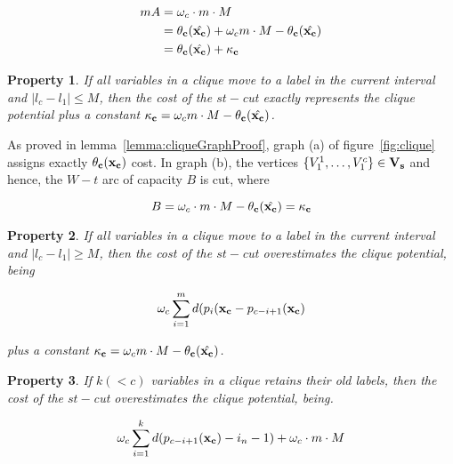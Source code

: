 \documentclass[10pt,letterpaper]{article}
\newtheorem{property}{Property}
\begin{document}
\begin{align*}
mA &= \omega_c \cdot m \cdot M \\
&= \theta_{\bf c}(\hat{{\bf x}_{\bf c}}) + \omega_c m \cdot M - \theta_{\bf c}(\hat{{\bf x}_{\bf c}})\\
&= \theta_{\bf c}(\hat{{\bf x}_{\bf c}}) + {\bf \kappa}_{\bf c}
\end{align*}

\begin{property} If all variables in a clique move to a label in the current interval and $|l_c - l_1| \leq M$, then the cost of the $st-$cut exactly represents the clique potential plus a constant ${\bf \kappa}_{\bf c} = \omega_c m \cdot M - \theta_{\bf c}(\hat{{\bf x}_{\bf c}})$.
\end{property}

As proved in lemma~\ref{lemma:cliqueGraphProof}, graph (a) of figure~\ref{fig:clique} assigns exactly $\theta_{\bf c}({\bf x}_{\bf c})$ cost. In graph (b), the vertices $\{V_1^1, \dots, V_1^c \} \in {\bf V}_{\bf s}$ and hence, the $W-t$ arc of capacity $B$ is cut, where  

\begin{equation*}
B = \omega_c \cdot m \cdot M - \theta_{\bf c}(\hat{{\bf x}_{\bf c}}) = {\bf \kappa}_{\bf c}
\end{equation*}

\begin{property} If all variables in a clique move to a label in the current interval and $|l_c - l_1| \geq M$, then the cost of the $st-$cut overestimates the clique potential, being 

\begin{equation*}
\omega_c \sum_{i = 1}^{m} d(p_i({\bf x}_{\bf c} - p_{c - i + 1}({\bf x}_{\bf c})
\end{equation*}

plus a constant ${\bf \kappa}_{\bf c} = \omega_c m \cdot M - \theta_{\bf c}(\hat{{\bf x}_{\bf c}})$.

\end{property}

\begin{property} If $k ( < c)$ variables in a clique retains their old labels, then the cost of the $st-$cut overestimates the clique potential, being.
\end{property}

\begin{equation*}
\omega_c \sum_{i = 1}^{k} d(p_{c - i + 1}({\bf x}_{\bf c}) - i_n - 1) + \omega_c \cdot m \cdot M 
\end{equation*}
\end{document}
